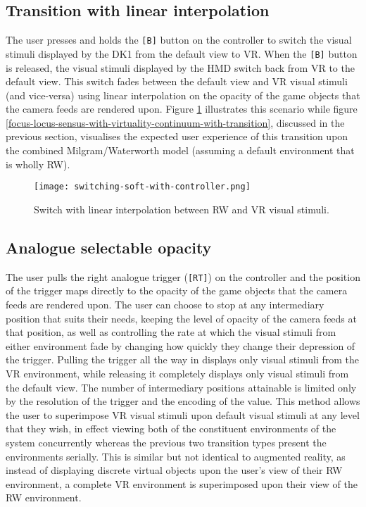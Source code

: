 \subsection{Transition with linear interpolation}
\label{transition-with-linear-interpolation}
The user presses and holds the \texttt{[B]} button on the controller to switch the visual stimuli displayed by the DK1 from the default view to VR. When the \texttt{[B]} button is released, the visual stimuli displayed by the HMD switch back from VR to the default view. This switch fades between the default view and VR visual stimuli (and vice-versa) using linear interpolation on the opacity of the game objects that the camera feeds are rendered upon. Figure \ref{scenario12} illustrates this scenario while figure \ref{focus-locus-sensus-with-virtuality-continuum-with-transition}, discussed in the previous section, visualises the expected user experience of this transition upon the combined Milgram/Waterworth model (assuming a default environment that is wholly RW).

\begin{figure}[h]
	\begin{center}
		\texttt{[image: switching-soft-with-controller.png]}
		\caption{Switch with linear interpolation between RW and VR visual stimuli.}
		\label{scenario12}
	\end{center}
\end{figure}


\subsection{Analogue selectable opacity}
\label{analogue-selectable-opacity}
The user pulls the right analogue trigger (\texttt{[RT]}) on the controller and the position of the trigger maps directly to the opacity of the game objects that the camera feeds are rendered upon. The user can choose to stop at any intermediary position that suits their needs, keeping the level of opacity of the camera feeds at that position, as well as controlling the rate at which the visual stimuli from either environment fade by changing how quickly they change their depression of the trigger. Pulling the trigger all the way in displays only visual stimuli from the VR environment, while releasing it completely displays only visual stimuli from the default view. The number of intermediary positions attainable is limited only by the resolution of the trigger and the encoding of the value. This method allows the user to superimpose VR visual stimuli upon default visual stimuli at any level that they wish, in effect viewing both of the constituent environments of the system concurrently whereas the previous two transition types present the environments serially. This is similar but not identical to augmented reality, as instead of displaying discrete virtual objects upon the user's view of their RW environment, a complete VR environment is superimposed upon their view of the RW environment.

